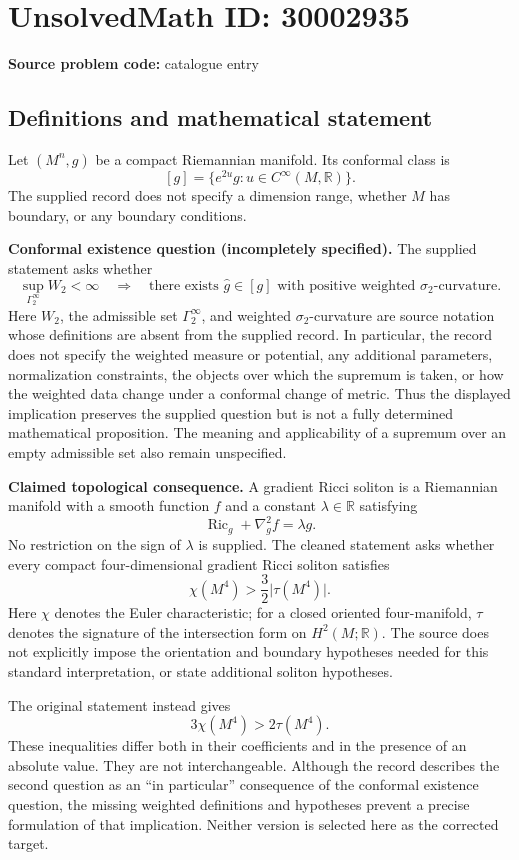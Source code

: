 \documentclass[11pt]{article}
\newcommand{\R}{\mathbb{R}}
\begin{document}
\section*{UnsolvedMath ID: 30002935}
\textbf{Source problem code:} catalogue entry
\subsection{Definitions and mathematical statement}
Let \((M^n,g)\) be a compact Riemannian manifold. Its conformal class is
\[
[g]=\{e^{2u}g:u\in C^\infty(M,\R)\}.
\]
The supplied record does not specify a dimension range, whether \(M\) has boundary, or any boundary conditions.

\textbf{Conformal existence question (incompletely specified).} The supplied statement asks whether
\[
\sup_{\Gamma_2^\infty}W_2<\infty
\quad\Longrightarrow\quad
\text{there exists }\widehat g\in[g]\text{ with positive weighted }\sigma_2\text{-curvature}.
\]
Here \(W_2\), the admissible set \(\Gamma_2^\infty\), and weighted \(\sigma_2\)-curvature are source notation whose definitions are absent from the supplied record. In particular, the record does not specify the weighted measure or potential, any additional parameters, normalization constraints, the objects over which the supremum is taken, or how the weighted data change under a conformal change of metric. Thus the displayed implication preserves the supplied question but is not a fully determined mathematical proposition. The meaning and applicability of a supremum over an empty admissible set also remain unspecified.

\textbf{Claimed topological consequence.} A gradient Ricci soliton is a Riemannian manifold with a smooth function \(f\) and a constant \(\lambda\in\R\) satisfying
\[
\operatorname{Ric}_g+\nabla_g^2f=\lambda g.
\]
No restriction on the sign of \(\lambda\) is supplied. The cleaned statement asks whether every compact four-dimensional gradient Ricci soliton satisfies
\[
\chi(M^4)>\frac32\lvert\tau(M^4)\rvert.
\]
Here \(\chi\) denotes the Euler characteristic; for a closed oriented four-manifold, \(\tau\) denotes the signature of the intersection form on \(H^2(M;\R)\). The source does not explicitly impose the orientation and boundary hypotheses needed for this standard interpretation, or state additional soliton hypotheses.

The original statement instead gives
\[
3\chi(M^4)>2\tau(M^4).
\]
These inequalities differ both in their coefficients and in the presence of an absolute value. They are not interchangeable. Although the record describes the second question as an ``in particular'' consequence of the conformal existence question, the missing weighted definitions and hypotheses prevent a precise formulation of that implication. Neither version is selected here as the corrected target.
\end{document}
